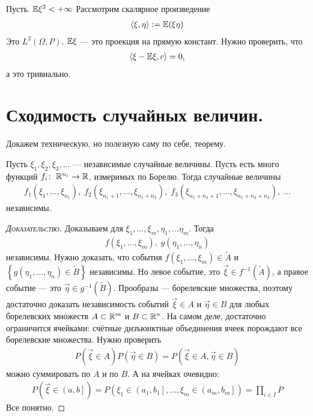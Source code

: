 \documentclass[../main.tex]{subfiles}
\begin{document}
\begin{remrk*}
 Пусть. $ \mathbb E\xi^{2} < +\infty $ Рассмотрим скалярное произведение
 \begin{align*}
  \left\langle \xi,\eta \right\rangle := \mathbb E(\xi\eta)
 \end{align*} Это $ L^{2}(\Omega, P) $. $\mathbb E\xi$ --- это проекция на прямую констант. Нужно проверить, что
 \begin{align*}
  \left\langle \xi - \mathbb E\xi, c \right\rangle = 0,
 \end{align*} а это тривиально.
\end{remrk*}

\section{Сходимость случайных величин.}

Докажем техническую, но полезную саму по себе, теорему.

\begin{thm}
 Пусть $ \xi_1, \xi_2, \xi_3, \ldots $ --- независимые случайные величины. Пусть есть много функций $ f_i \colon\;\mathbb{R}^{n_i} \to \mathbb{R} $, измеримых по Борелю. Тогда случайные величины
 \begin{align*}
  f_1(\xi_1, \ldots, \xi_{n_1}),\; f_2(\xi_{n_1 + 1}, \ldots, \xi_{n_1 + n_2}),\; f_3(\xi_{n_1 + n_2 + 1}, \ldots, \xi_{n_1 + n_2 + n_3}),\; \ldots
 \end{align*} независимы.
\end{thm}
\begin{proof}[\normalfont\textsc{Доказательство}]
 Доказываем для $ \xi_1, \ldots, \xi_m, \eta_1, \ldots \eta_m $. Тогда
 \begin{align*}
  f(\xi_1, \ldots, \xi_m),\;g(\eta_1, \ldots, \eta_n)
 \end{align*}  независимы. Нужно доказать, что события $ f(\xi_1, \ldots,\xi_m) \in \tilde A $ и $ \left\{ g(\eta_1, \ldots, \eta_n) \in \tilde B \right\} $ независимы. Но левое событие, это $ \vec\xi \in f^{-1}(\tilde A) $, а правое событие --- это $ \vec\eta \in g^{-1}(\tilde B) $. Прообразы --- борелевские множества, поэтому достаточно доказать независимость событий $ \vec\xi \in A $ и $ \vec\eta \in B $ для любых борелевских множеств $ A \subset\mathbb{R}^{m} $ и $ B \subset \mathbb{R}^{n} $. На самом деле, достаточно ограничится ячейками: счётные дизъюнктные объединения ячеек порождают все борелевские множества. Нужно проверить
 \begin{align*}
  P(\vec\xi \in A) P(\vec\eta \in B) = P(\vec\xi \in A, \vec\eta \in B)
 \end{align*} можно суммировать по $ A $ и по $ B $. А на ячейках очевидно:
 \begin{align*}
   P(\vec\xi \in \left(a, b\right]  ) = P(\xi_1 \in \left(a_1, b_1\right], \ldots, \xi_m \in \left(a_m, b_m\right]    ) = \prod_{i \in I}P
 \end{align*} Все понятно.
\end{proof}
\end{document}
